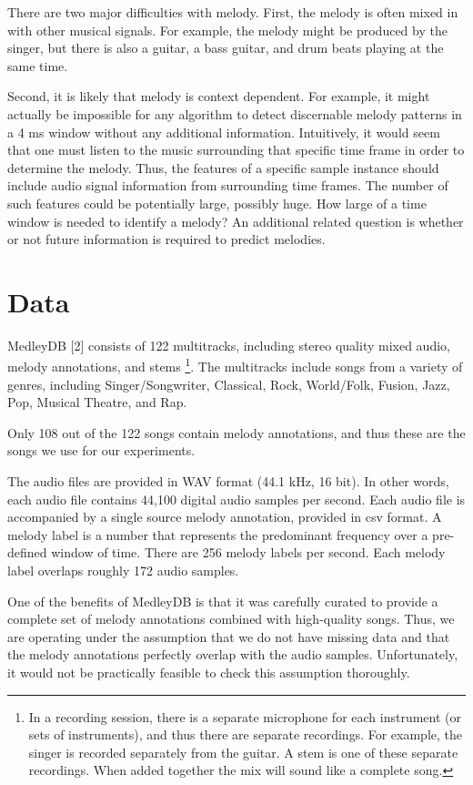 \documentclass{article} %
\begin{document}
There are two major difficulties with melody.  First, the melody is often mixed in with other musical signals.  For example, the melody might be produced by the singer, but there is also a guitar, a bass guitar, and drum beats playing at the same time.  

Second, it is likely that melody is context dependent.  For example, it might actually be impossible for any algorithm to detect discernable melody patterns in a 4 ms window without any additional information.  Intuitively, it would seem that one must listen to the music surrounding that specific time frame in order to determine the melody.  Thus, the features of a specific sample instance should include audio signal information from surrounding time frames.  The number of such features could be potentially large, possibly huge.  How large of a time window is needed to identify a melody?  An additional related question is whether or not future information is required to predict melodies.

\section{Data} \label{sec:data}

MedleyDB [2] consists of 122 multitracks, including stereo quality mixed audio, melody annotations, and stems \footnote{In a recording session, there is a separate microphone for each instrument (or sets of instruments), and thus there are separate recordings.  For example, the singer is recorded separately from the guitar.  A stem is one of these separate recordings.  When added together the mix will sound like a complete song.}.  The multitracks include songs from a variety of genres, including Singer/Songwriter, Classical, Rock, World/Folk, Fusion, Jazz, Pop, Musical Theatre, and Rap.

Only 108 out of the 122 songs contain melody annotations, and thus these are the songs we use for our experiments.

The audio files are provided in WAV format (44.1 kHz, 16 bit).  In other words, each audio file contains 44,100 digital audio samples per second.  Each audio file is accompanied by a single source melody annotation, provided in csv format.  A melody label is a number that represents the predominant frequency over a pre-defined window of time.  There are 256 melody labels per second.  Each melody label overlaps roughly 172 audio samples.

One of the benefits of MedleyDB is that it was carefully curated to provide a complete set of melody annotations combined with high-quality songs.  Thus, we are operating under the assumption that we do not have missing data and that the melody annotations perfectly overlap with the audio samples.  Unfortunately, it would not be practically feasible to check this assumption thoroughly.
\end{document}
